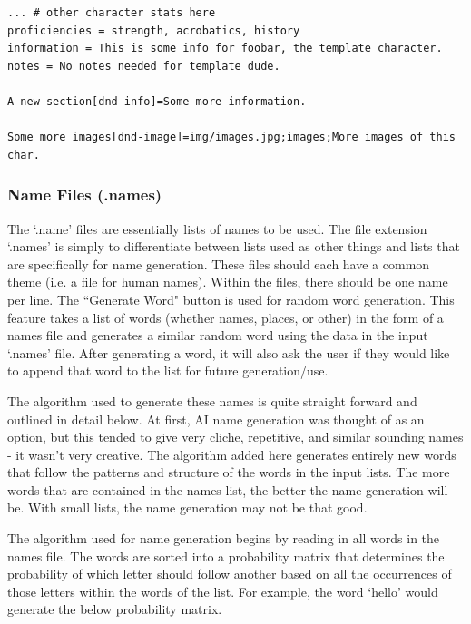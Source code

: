 \begin{lstlisting}
... # other character stats here
proficiencies = strength, acrobatics, history
information = This is some info for foobar, the template character.
notes = No notes needed for template dude.

A new section[dnd-info]=Some more information.

Some more images[dnd-image]=img/images.jpg;images;More images of this char.
\end{lstlisting}






\subsubsection{Name Files (.names) \label{section .names}}

The `.name' files are essentially lists of names to be used. The file extension `.names' is simply to differentiate between lists used as other things and lists that are specifically for name generation. These files should each have a common theme (i.e. a file for human names). Within the files, there should be one name per line. The ``Generate Word" button is used for random word generation. This feature takes a list of words (whether names, places, or other) in the form of a names file and generates a similar random word using the data in the input `.names' file. After generating a word, it will also ask the user if they would like to append that word to the list for future generation/use. 

The algorithm used to generate these names is quite straight forward and outlined in detail below. At first, AI name generation was thought of as an option, but this tended to give very cliche, repetitive, and similar sounding names - it wasn't very creative. The algorithm added here generates entirely new words that follow the patterns and structure of the words in the input lists. The more words that are contained in the names list, the better the name generation will be. With small lists, the name generation may not be that good.

The algorithm used for name generation begins by reading in all words in the names file. The words are sorted into a probability matrix that determines the probability of which letter should follow another based on all the occurrences of those letters within the words of the list. For example, the word `hello' would generate the below probability matrix.

